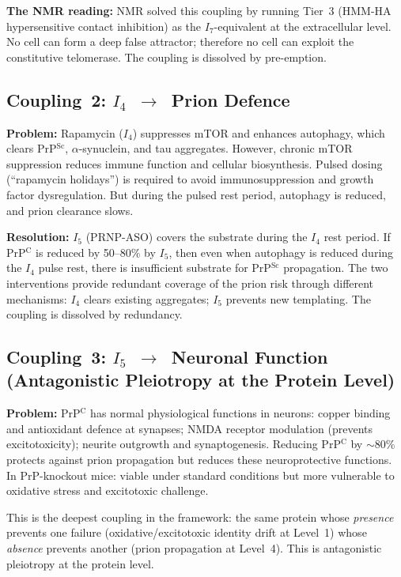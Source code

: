 \documentclass[12pt,a4paper]{article}
\newcommand{\prpc}{PrP$^{\mathrm{C}}$}
\newcommand{\prpsc}{PrP$^{\mathrm{Sc}}$}
\newcommand{\Inet}[1]{$I_{#1}$}
\begin{document}
\textbf{The NMR reading:} NMR solved this coupling by running Tier~3
(HMM-HA hypersensitive contact inhibition) as the \Inet{7}-equivalent at the
extracellular level. No cell can form a deep false attractor; therefore no
cell can exploit the constitutive telomerase. The coupling is dissolved by
pre-emption.

\subsection{Coupling~2: \Inet{4}~$\to$~Prion Defence}

\textbf{Problem:} Rapamycin (\Inet{4}) suppresses mTOR and enhances autophagy,
which clears \prpsc{}, $\alpha$-synuclein, and tau aggregates. However,
chronic mTOR suppression reduces immune function and cellular biosynthesis.
Pulsed dosing (``rapamycin holidays'') is required to avoid immunosuppression
and growth factor dysregulation. But during the pulsed rest period, autophagy
is reduced, and prion clearance slows.

\textbf{Resolution:} \Inet{5} (PRNP-ASO) covers the substrate during the
\Inet{4} rest period. If \prpc{} is reduced by 50--80\% by \Inet{5}, then
even when autophagy is reduced during the \Inet{4} pulse rest, there is
insufficient substrate for \prpsc{} propagation. The two interventions
provide redundant coverage of the prion risk through different mechanisms:
\Inet{4} clears existing aggregates; \Inet{5} prevents new templating.
The coupling is dissolved by redundancy.

\subsection{Coupling~3: \Inet{5}~$\to$~Neuronal Function
(Antagonistic Pleiotropy at the Protein Level)}

\textbf{Problem:} \prpc{} has normal physiological functions in neurons:
copper binding and antioxidant defence at synapses; NMDA receptor modulation
(prevents excitotoxicity); neurite outgrowth and synaptogenesis. Reducing
\prpc{} by $\sim$80\% protects against prion propagation but reduces these
neuroprotective functions. In PrP-knockout mice: viable under standard
conditions but more vulnerable to oxidative stress and excitotoxic challenge.

This is the deepest coupling in the framework: the same protein whose
\textit{presence} prevents one failure (oxidative/excitotoxic identity drift
at Level~1) whose \textit{absence} prevents another (prion propagation at
Level~4). This is antagonistic pleiotropy at the protein level.
\end{document}

